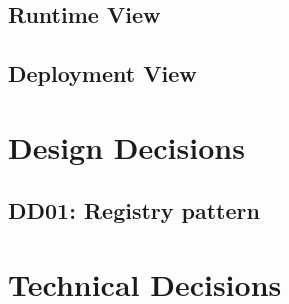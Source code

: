 \subsection{Runtime View}

\subsection{Deployment View}


\section{Design Decisions}

\subsection{DD01: Registry pattern}


\section{Technical Decisions}

